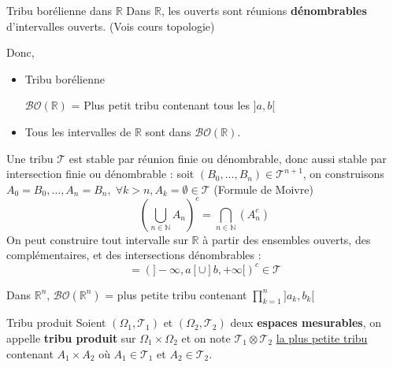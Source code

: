 \begin{Prop}{Tribu borélienne dans $\mathbb{R}$}{}
Dans $\mathbb{R}$, les ouverts sont réunions \textbf{dénombrables} d'intervalles ouverts. (Vois cours topologie)

Donc,
\begin{itemize}

    \item Tribu borélienne
\begin{center}
  $\mathcal{BO}(\mathbb{R})$ = Plus petit tribu contenant tous les $]a,b[$
\end{center}

\item Tous les intervalles de $\mathbb{R}$ sont dans $\mathcal{BO}(\mathbb{R})$.

\end{itemize}
\end{Prop}

\begin{myproof}{}{}
Une tribu $\mathcal{T}$ est stable par réunion finie ou dénombrable, donc aussi stable par intersection finie ou dénombrable : soit $(B_0, \dots, B_n ) \in \mathcal{T} ^{n+1}$, on construisons $A_0 = B_0, \dots, A_n = B_n, \; \forall k >n, A _{k} = \emptyset \in \mathcal{T}$ (Formule de Moivre) 
\begin{equation}
  \left( \bigcup _{n \in \mathbb{N}} A_n \right) ^{c} = \bigcap_{n \in \mathbb{N}}^{} ( A_n ^{c})
\end{equation}
On peut construire tout intervalle sur \(\mathbb{R}\) à partir des ensembles ouverts, des complémentaires, et des intersections dénombrables : 
\begin{equation}
  [a,b] = \left( ]- \infty, a[ \cup ]b, + \infty[ \right) ^{c} \in \mathcal{T}
\end{equation}
\end{myproof}


\begin{Example}{}{}
  Dans $\mathbb{R} ^{n}$, $\mathcal{BO}(\mathbb{R} ^{n})$ = plus petite tribu contenant $\prod _{k=1} ^{n}]a_k,b_k[$
\end{Example}









\begin{Prop}{Tribu produit}{}
Soient $(\Omega_1, \mathcal{T}_1)$ et $(\Omega_2, \mathcal{T}_2)$ deux \textbf{espaces mesurables}, on appelle \textbf{tribu produit} sur $\Omega_1 \times \Omega_2$ et on note $\mathcal{T}_1 \otimes \mathcal{T}_2$ \underline{la plus petite tribu} contenant $A_1 \times A_2$ où $A_1 \in \mathcal{T}_1$ et $A_2 \in \mathcal{T}_2$.
\end{Prop}


